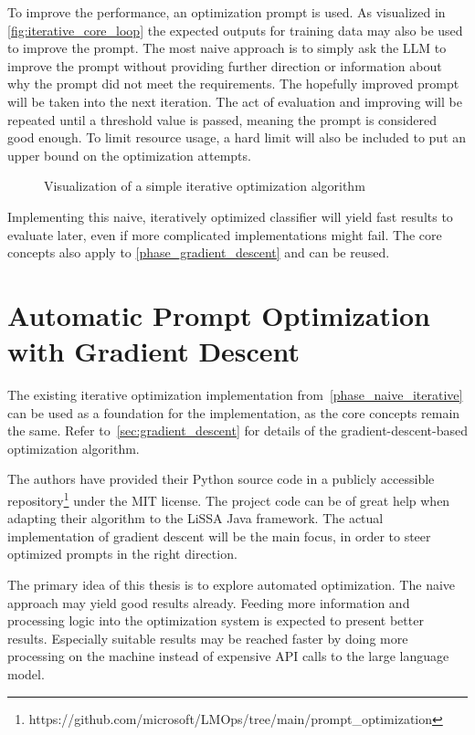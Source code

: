 To improve the performance, an optimization prompt is used.
As visualized in \autoref{fig:iterative_core_loop} the expected outputs for training data may also be used to improve the prompt.
The most naive approach is to simply ask the LLM to improve the prompt without providing further direction or information about why the prompt did not meet the requirements.
The hopefully improved prompt will be taken into the next iteration.
The act of evaluation and improving will be repeated until a threshold value is passed, meaning the prompt is considered good enough.
To limit resource usage, a hard limit will also be included to put an upper bound on the optimization attempts.

\begin{figure}
    \centering
    
    \caption{Visualization of a simple iterative optimization algorithm}
    \label{fig:iterative_core_loop}
\end{figure}

Implementing this naive, iteratively optimized classifier will yield fast results to evaluate later, even if more complicated implementations might fail.
The core concepts also apply to \autoref{phase_gradient_descent} and can be reused.


\section{Automatic Prompt Optimization with Gradient Descent}
\label{approach:sec:gradient_descent}
The existing iterative optimization implementation from~\autoref{phase_naive_iterative} can be used as a foundation for the implementation, as the core concepts remain the same.
Refer to~\autoref{sec:gradient_descent} for details of the gradient-descent-based optimization algorithm.

The authors have provided their Python source code in a publicly accessible repository\footnote{https://github.com/microsoft/LMOps/tree/main/prompt\_optimization} under the MIT license.
The project code can be of great help when adapting their algorithm to the LiSSA Java framework.
The actual implementation of gradient descent will be the main focus, in order to steer optimized prompts in the right direction.

The primary idea of this thesis is to explore automated optimization.
The naive approach may yield good results already.
Feeding more information and processing logic into the optimization system is expected to present better results.
Especially suitable results may be reached faster by doing more processing on the machine instead of expensive API calls to the large language model.


